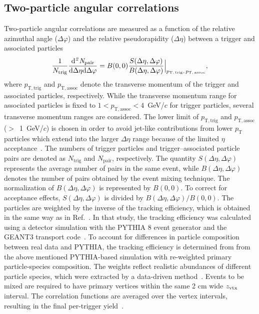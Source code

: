 \subsection{Two-particle angular correlations}
Two-particle angular correlations are measured as a function of the relative azimuthal angle ($\Delta\varphi$) and the relative pseudorapidity ($\Delta\eta$) between a trigger and associated particles
\begin{eqnarray}
\frac{1}{N_{\rm{trig}}} \frac{ \rm{d}\it{}^{2} N_{\rm{pair}} }{ \rm{d} \Delta\eta \rm{d}\Delta\varphi} = B(0, 0)\frac{S(\Delta\eta, \Delta\varphi)}{B(\Delta\eta, \Delta\varphi)}  \Big\lvert_{p_\mathrm{T,\,trig},\,p_\mathrm{T,\,assoc}},
\label{eq:corrfunction}
\end{eqnarray}
where $p_\mathrm{T,trig}$ and $p_\mathrm{T,assoc}$ denote the transverse momentum of the trigger and associated particles, respectively.
While the transverse momentum range for associated particles is fixed to $1<p_\mathrm{T,assoc}<4$~GeV/$c$ for trigger particles, several transverse momentum ranges are considered. The lower limit of $p_\mathrm{T,trig}$ and $p_\mathrm{T,assoc}$ ($>$~1~GeV/$c$) is chosen in order to avoid jet-like contributions from lower $p_\mathrm{T}$ particles which extend into the larger $\Delta\eta$ range because of the limited $\eta$ acceptance~\cite{ALICE:2021nir}. The numbers of trigger particles and trigger--associated particle pairs are denoted as $N_\mathrm{trig}$ and $N_\mathrm{pair}$, respectively.
The quantity $S(\Delta\eta, \Delta\varphi)$ represents the average number of pairs in the same event, while $B(\Delta\eta, \Delta\varphi)$ denotes the number of pairs obtained by the event mixing technique. The normalization of $B(\Delta\eta, \Delta\varphi)$ is represented by $B(0,0)$. To correct for acceptance effects, $S(\Delta\eta, \Delta\varphi)$ is divided by $B(\Delta\eta, \Delta\varphi)/B(0,0)$. The particles are weighted by the inverse of the tracking efficiency, which is obtained in the same way as in Ref.~\cite{ALICE:2021nir}. In that study, the tracking efficiency was calculated using a detector simulation with the PYTHIA 8 event generator and the GEANT3 transport code~\cite{Brun:1994aa}. To account for differences in particle composition between real data and PYTHIA, the tracking efficiency is determined from from the above mentioned PYTHIA-based simulation with re-weighted primary particle-species composition.
The weights reflect realistic abundances of different particle species, which were extracted by a data-driven method~\cite{ALICE:2018hza, ALICE:2018vuu}.
Events to be mixed are required to have primary vertices within the same 2 cm wide $z_{\rm vtx}$ interval. The correlation functions are averaged over the vertex intervals, resulting in the final per-trigger yield~\cite{Kopylov:1974th,Adam:2016tsv}. 

